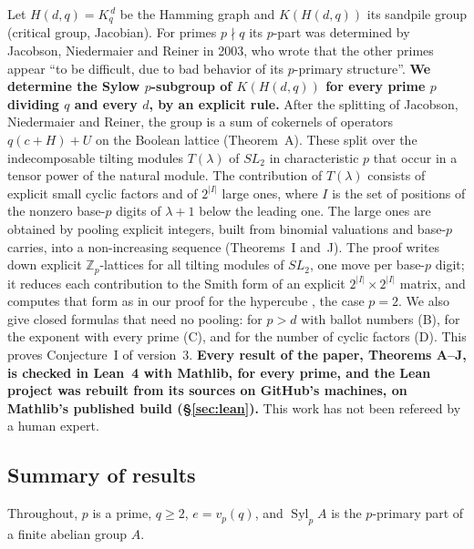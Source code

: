 \documentclass[10pt]{article}
\theoremstyle{ds}
\theoremstyle{dsrem}
\newcommand{\Z}{\mathbb{Z}}
\newcommand{\Syl}{\operatorname{Syl}}
\begin{document}
Let $H(d,q)=K_q^{\,d}$ be the Hamming graph and $K(H(d,q))$ its sandpile group (critical group, Jacobian). For primes $p\nmid q$ its $p$-part was determined by Jacobson, Niedermaier and Reiner in 2003, who wrote that the other primes appear ``to be difficult, due to bad behavior of its $p$-primary structure''. {\boldmath\textbf{We determine the Sylow $p$-subgroup of $K(H(d,q))$ for every prime $p$ dividing $q$ and every $d$, by an explicit rule.}} After the splitting of Jacobson, Niedermaier and Reiner, the group is a sum of cokernels of operators $q(c+H)+U$ on the Boolean lattice (Theorem~A). These split over the indecomposable tilting modules $T(\lambda)$ of $SL_2$ in characteristic $p$ that occur in a tensor power of the natural module. The contribution of $T(\lambda)$ consists of explicit small cyclic factors and of $2^{|I|}$ large ones, where $I$ is the set of positions of the nonzero base-$p$ digits of $\lambda+1$ below the leading one. The large ones are obtained by pooling explicit integers, built from binomial valuations and base-$p$ carries, into a non-increasing sequence (Theorems~I and~J). The proof writes down explicit $\Z_p$-lattices for all tilting modules of $SL_2$, one move per base-$p$ digit; it reduces each contribution to the Smith form of an explicit $2^{|I|}\times2^{|I|}$ matrix, and computes that form as in our proof for the hypercube \cite{DST}, the case $p=2$. We also give closed formulas that need no pooling: for $p>d$ with ballot numbers (B), for the exponent with every prime (C), and for the number of cyclic factors (D). This proves Conjecture~I of version~3. {\boldmath\textbf{Every result of the paper, Theorems A--J, is checked in Lean~4 with Mathlib, for every prime, and the Lean project was rebuilt from its sources on GitHub's machines, on Mathlib's published build (\S\ref{sec:lean}).}} This work has not been refereed by a human expert.


\clearpage
\subsection*{Summary of results}
Throughout, $p$ is a prime, $q\ge2$, $e=v_p(q)$, and $\Syl_pA$ is the $p$-primary part of a finite abelian group $A$.
\end{document}
